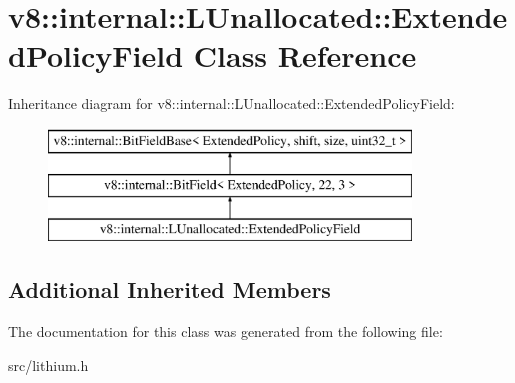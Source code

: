 \hypertarget{classv8_1_1internal_1_1_l_unallocated_1_1_extended_policy_field}{}\section{v8\+:\+:internal\+:\+:L\+Unallocated\+:\+:Extended\+Policy\+Field Class Reference}
\label{classv8_1_1internal_1_1_l_unallocated_1_1_extended_policy_field}
Inheritance diagram for v8\+:\+:internal\+:\+:L\+Unallocated\+:\+:Extended\+Policy\+Field\+:\begin{figure}[H]
\begin{center}
\leavevmode
\includegraphics[height=3.000000cm]{classv8_1_1internal_1_1_l_unallocated_1_1_extended_policy_field}
\end{center}
\end{figure}
\subsection*{Additional Inherited Members}


The documentation for this class was generated from the following file\+:\begin{DoxyCompactItemize}
\item 
src/lithium.\+h\end{DoxyCompactItemize}
